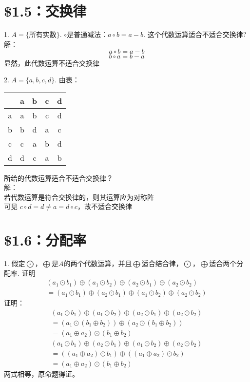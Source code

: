 \documentclass{ctexart}
\begin{document}
\section*{\$1.5：交换律}
1. $A=\{$所有实数$\}$. $\circ$是普通减法：$a \circ b = a-b$. 这个代数运算适合不适合交换律? \\
解：\\
\begin{equation*}
	a \circ b  = a - b
\end{equation*}
\begin{equation*}
	b \circ a = b - a
\end{equation*}
显然，此代数运算不适合交换律

2. $A=\{a,b,c,d\}$. 由表：\\
\begin{center}
	\begin{tabular}{c|cccc}
		& a & b & c & d\\
		\hline
		a & a & b & c & d\\
		b & b & d & a & c\\
		c & c & a & b & d\\
		d & d & c & a & b\\
	\end{tabular} 
\end{center}
所给的代数运算适合不适合交换律？\\
解： \\
若代数运算是符合交换律的，则其运算应为对称阵\\
可见 $c \circ d = d \neq a = d \circ c$，故不适合交换律

\section*{\$1.6：分配率}
1. 假定$\bigodot$，$\bigoplus$是$A$的两个代数运算，并且$\bigoplus$适合结合律，$\bigodot$，$\bigoplus$适合两个分配率. 证明
\begin{align*}
	 (a_1 \odot b_1)\oplus(a_1 \odot b_2)\oplus(a_2 \odot b_1)\oplus(a_2 \odot b_2) \\
	= (a_1 \odot b_1)\oplus(a_2 \odot b_1)\oplus(a_1 \odot b_2)\oplus(a_2 \odot b_2)
\end{align*}
证明：
\begin{align*}
	(a_1 \odot b_1)\oplus(a_1 \odot b_2)\oplus(a_2 \odot b_1)\oplus(a_2 \odot b_2) \\
	= (a_1 \odot (b_1 \oplus b_2)) \oplus (a_2 \odot (b_1 \oplus b_2)) \\
	= (a_1 \oplus a_2) \odot (b_1 \oplus b_2)
\end{align*}
\begin{align*}
	(a_1 \odot b_1)\oplus(a_2 \odot b_1)\oplus(a_1 \odot b_2)\oplus(a_2 \odot b_2) \\
	= ((a_1 \oplus a_2) \odot b_1) \oplus ((a_1 \oplus a_2) \odot b_2) \\
	= (a_1 \oplus a_2) \odot (b_1 \oplus b_2)
\end{align*}
两式相等，原命题得证。
\end{document}
